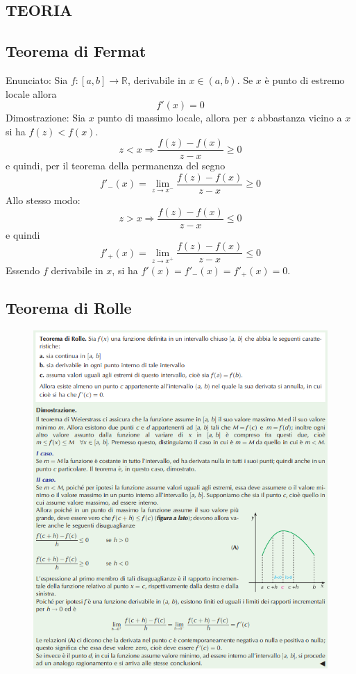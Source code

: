 \documentclass[a4paper, 9pt]{report}
\begin{document}
\subsection*{TEORIA}
\subsection*{Teorema di Fermat}
Enunciato:\newline
Sia $f:[a,b]\rightarrow \mathbb{R}$, derivabile in $x \in(a,b)$. Se $x$ è punto di estremo locale allora
\[
    f'(x) = 0
\]
Dimostrazione:\newline
Sia $x$ punto di massimo locale, allora per $z$ abbastanza vicino a $x$ si ha $f(z)<f(x)$. 
\[
    z<x \Rightarrow \frac{f(z)-f(x)}{z-x} \geq 0
\]
e quindi, per il teorema della permanenza del segno
\[
    f'_-(x) = \lim_{z\rightarrow x^-} \frac{f(z)-f(x)}{z-x} \geq 0
\]
Allo stesso modo:
\[
    z>x \Rightarrow \frac{f(z)-f(x)}{z-x} \leq 0
\]
e quindi
\[
    f'_+(x) = \lim_{z\rightarrow x^+} \frac{f(z)-f(x)}{z-x} \leq 0
\]
Essendo $f$ derivabile in $x$, si ha $f'(x) = f'_-(x) = f'_+(x) = 0$.
\newpage
\subsection*{Teorema di Rolle}
\begin{figure}[h!]
    \includegraphics[width=\linewidth]{../dim/Rolle.PNG}
\end{figure}
\newpage
\end{document}
